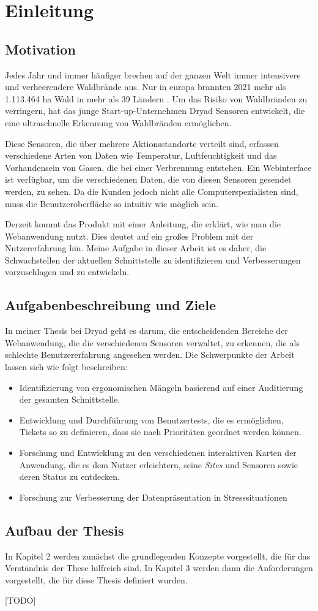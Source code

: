 \chapter{Einleitung}

\section{Motivation}

Jedes Jahr und immer häufiger brechen auf der ganzen Welt immer intensivere und verheerendere Waldbrände aus.
Nur in europa brannten 2021 mehr als 1.113.464 ha Wald in mehr als 39 Ländern \cite{JRC}.
Um das Risiko von Waldbränden zu verringern, hat das junge Start-up-Unternehmen Dryad Sensoren entwickelt, die eine ultraschnelle Erkennung von Waldbränden ermöglichen.

Diese Sensoren, die über mehrere Aktionsstandorte verteilt sind, erfassen verschiedene Arten von Daten wie Temperatur, Luftfeuchtigkeit und das Vorhandensein von Gasen, die bei einer Verbrennung entstehen.
Ein Webinterface ist verfügbar, um die verschiedenen Daten, die von diesen Sensoren gesendet werden, zu sehen.
Da die Kunden jedoch nicht alle Computerspezialisten sind, muss die Benutzeroberfläche so intuitiv wie möglich sein.

Derzeit kommt das Produkt mit einer Anleitung, die erklärt, wie man die Webanwendung nutzt. Dies deutet auf ein großes Problem mit der Nutzererfahrung hin.
Meine Aufgabe in dieser Arbeit ist es daher, die Schwachstellen der aktuellen Schnittstelle zu identifizieren und Verbesserungen vorzuschlagen und zu entwickeln.

\section{Aufgabenbeschreibung und Ziele} \label{sec:targets}

In meiner Thesis bei Dryad geht es darum, die entscheidenden Bereiche der Webanwendung, die die verschiedenen Sensoren verwaltet, zu erkennen, die als schlechte Benutzererfahrung angesehen werden.
Die Schwerpunkte der Arbeit lassen sich wie folgt beschreiben:

\begin{itemize}
  \item Identifizierung von ergonomischen Mängeln basierend auf einer Auditierung der gesamten Schnittstelle.
  \item Entwicklung und Durchführung von Benutzertests, die es ermöglichen, Tickets so zu definieren, dass sie nach Prioritäten geordnet werden können.
  \item Forschung und Entwicklung zu den verschiedenen interaktiven Karten der Anwendung, die es dem Nutzer erleichtern, seine \textit{Sites} und Sensoren sowie deren Status zu entdecken.
  \item Forschung zur Verbesserung der Datenpräsentation in Stresssituationen
\end{itemize}

\section{Aufbau der Thesis}

In Kapitel 2 werden zunächst die grundlegenden Konzepte vorgestellt, die für das Verständnis der These hilfreich sind. In Kapitel 3 werden dann die Anforderungen vorgestellt, die für diese Thesis definiert wurden.

  [TODO]